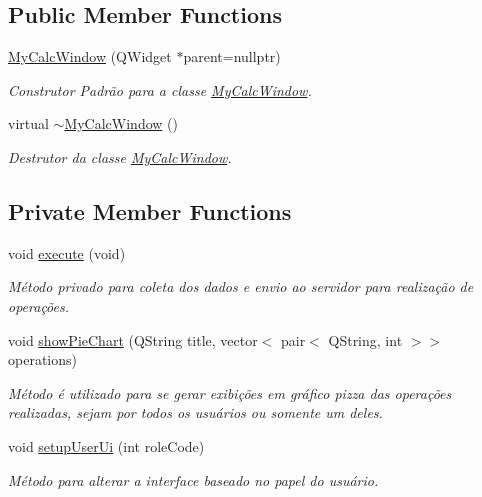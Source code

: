 \subsection*{Public Member Functions}
\begin{DoxyCompactItemize}
\item 
\hyperlink{classMyCalcWindow_ac205ab2dbfbf802859774a090b066518}{My\+Calc\+Window} (Q\+Widget $\ast$parent=nullptr)
\begin{DoxyCompactList}\small\item\em Construtor Padrão para a classe \hyperlink{classMyCalcWindow}{My\+Calc\+Window}. \end{DoxyCompactList}\item 
virtual \hyperlink{classMyCalcWindow_a6226362b86860c067418d16b7da1e1e2}{$\sim$\+My\+Calc\+Window} ()
\begin{DoxyCompactList}\small\item\em Destrutor da classe \hyperlink{classMyCalcWindow}{My\+Calc\+Window}. \end{DoxyCompactList}\end{DoxyCompactItemize}
\subsection*{Private Member Functions}
\begin{DoxyCompactItemize}
\item 
void \hyperlink{classMyCalcWindow_a734b9dd51ee199d930855444695625c7}{execute} (void)
\begin{DoxyCompactList}\small\item\em Método privado para coleta dos dados e envio ao servidor para realização de operações. \end{DoxyCompactList}\item 
void \hyperlink{classMyCalcWindow_ade7d295cb55effe865349b7eef1a6d1a}{show\+Pie\+Chart} (Q\+String title, vector$<$ pair$<$ Q\+String, int $>$$>$ operations)
\begin{DoxyCompactList}\small\item\em Método é utilizado para se gerar exibições em gráfico pizza das operações realizadas, sejam por todos os usuários ou somente um deles. \end{DoxyCompactList}\item 
void \hyperlink{classMyCalcWindow_a9e1e6c80336ba383e2d2a8419446e1f9}{setup\+User\+Ui} (int role\+Code)
\begin{DoxyCompactList}\small\item\em Método para alterar a interface baseado no papel do usuário. \end{DoxyCompactList}\end{DoxyCompactItemize}
